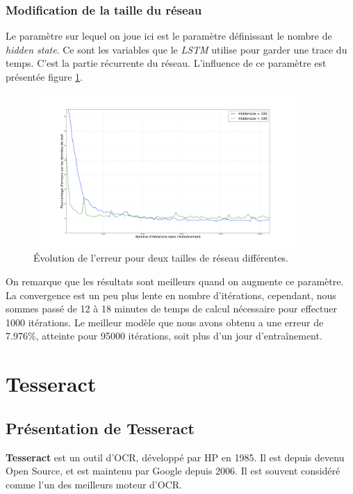\documentclass{report}
\begin{document}
\subsubsection{Modification de la taille du réseau}

Le paramètre sur lequel on joue ici est le paramètre définissant le nombre de \textit{hidden state}.
Ce sont les variables que le \textit{LSTM} utilise pour garder une trace du temps.
C'est la partie récurrente du réseau.
L'influence de ce paramètre est présentée figure \ref{err_size}.

\begin{figure}[!h] 
    \center
    \includegraphics[width=10cm]{error_plot_size.png}
    \caption{Évolution de l'erreur pour deux tailles de réseau différentes.}
    \label{err_size}
\end{figure}

On remarque que les résultats sont meilleurs quand on augmente ce paramètre.
La convergence est un peu plus lente en nombre d'itérations, cependant, nous sommes passé de 12 à 18 minutes de temps de calcul nécessaire pour effectuer 1000 itérations.
Le meilleur modèle que nous avons obtenu a une erreur de 7.976\%, atteinte pour 95000 itérations, soit plus d'un jour d'entraînement. 

\FloatBarrier
\newpage

\section{Tesseract}

\subsection{Présentation de Tesseract}

\textbf{Tesseract} est un outil d'OCR, développé par HP en 1985.
Il est depuis devenu Open Source, et est maintenu par Google depuis 2006.
Il est souvent considéré comme l'un des meilleurs moteur d'OCR.
\end{document}
